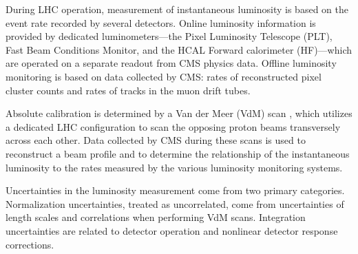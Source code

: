 During LHC operation, measurement of  instantaneous luminosity is based on the event rate recorded by several detectors. Online luminosity information is provided by dedicated luminometers---the Pixel Luminosity Telescope (PLT), Fast Beam Conditions Monitor, and the HCAL Forward calorimeter (HF)---which are operated on a separate readout from CMS physics data. Offline luminosity monitoring is based on data collected by CMS: rates of reconstructed pixel cluster counts and rates of tracks in the muon drift tubes\cite{Lujan:2647819}.

Absolute calibration is determined by a Van der Meer (VdM) scan \cite{vanderMeer:1968zz}\cite{Balagura:2011yw}, which utilizes a dedicated LHC configuration to scan the opposing proton beams transversely across each other. Data collected by CMS during these scans is used to reconstruct a beam profile and to determine the relationship of the instantaneous luminosity to the rates measured by the various luminosity monitoring systems.

Uncertainties in the luminosity measurement come from two primary categories. Normalization uncertainties, treated as uncorrelated, come from uncertainties of length scales and correlations when performing VdM scans. Integration uncertainties are related to detector operation and nonlinear detector response corrections\cite{CMS:2018elu}.